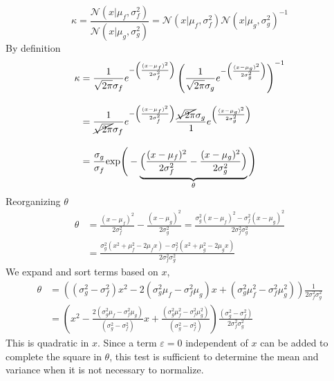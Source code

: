 \documentclass[article]{jss}
\newcommand{\N}{\mathcal{N}}
\begin{document}
\begin{equation}
\kappa = \frac{\N(x|\mu_f,\sigma_f^2)}{\N(x|\mu_g,\sigma_g^2)} = \N(x|\mu_f,\sigma_f^2)\N(x|\mu_g,\sigma_g^2)^{-1}
\end{equation}
%
By definition
\begin{equation}
\begin{split}
\kappa & = \frac{1}{\sqrt{2\pi}\sigma_f}e^{-\left(\frac{(x-\mu_f)^2}{2\sigma_f^2}\right)} \left( \frac{1}{\sqrt{2\pi}\sigma_g}e^{-\left(\frac{(x-\mu_g)^2}{2\sigma_g^2}\right)} \right)^{-1} \\[0.3cm]
& = \frac{1}{\cancel{\sqrt{2\pi}}\sigma_f}e^{-\left(\frac{(x-\mu_f)^2}{2\sigma_f^2}\right)} \frac{\cancel{\sqrt{2\pi}}\sigma_g}{1} e^{\left(\frac{(x-\mu_g)^2}{2\sigma_g^2}\right)} \\[0.3cm]
& = \frac{\sigma_g}{\sigma_f}\text{exp}\Bigg(-\underbrace{\Big(\frac{(x-\mu_f)^2}{2\sigma_f^2} - \frac{(x-\mu_g)^2}{2\sigma_g^2}\Big)}_{\theta}\Bigg)
\end{split}
\end{equation}
%
Reorganizing $\theta$
\begin{equation}
\begin{split}
 \theta & = \frac{(x-\mu_f)^2}{2\sigma_f^2} - \frac{(x-\mu_g)^2}{2\sigma_g^2} = \frac{\sigma_g^2(x-\mu_f)^2 - \sigma_f^2(x-\mu_g)^2}{2\sigma_f^2\sigma_g^2} \\[0.3cm]
 & = \frac{\sigma_g^2(x^2+\mu_f^2-2\mu_fx) - \sigma_f^2(x^2+\mu_g^2-2\mu_gx)}{2\sigma_f^2\sigma_g^2}
\end{split}
\end{equation}
%
We expand and sort terms based on $x$,
%
\begin{equation}
\begin{split}
 \theta & = \left((\sigma_g^2 - \sigma_f^2)x^2 - 2(\sigma_g^2\mu_f - \sigma_f^2\mu_g)x + (\sigma_g^2\mu_f^2 - \sigma_f^2\mu_g^2 )\right) \frac{1}{2\sigma_f^2\sigma_g^2} \\[0.3cm]
 & = \left(x^2 - \frac{2(\sigma_g^2\mu_f - \sigma_f^2\mu_g)}{(\sigma_g^2 - \sigma_f^2)}x + \frac{(\sigma_g^2\mu_f^2 - \sigma_f^2\mu_g^2 )}{(\sigma_g^2 - \sigma_f^2)}\right) \frac{(\sigma_g^2 - \sigma_f^2)}{2\sigma_f^2\sigma_g^2}
\end{split}
\end{equation}
%
This is quadratic in $x$. Since a term $\varepsilon=0$ independent of $x$ can be added to complete the square in $\theta$, this test is sufficient to determine the mean and variance when it is not necessary to normalize. 
\end{document}

